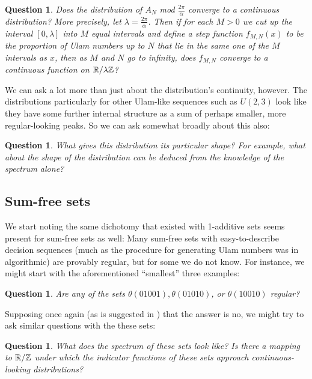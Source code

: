 \documentclass{article}
\newtheorem{question}[theorem]{Question}
\theoremstyle{definition}
\theoremstyle{remark}
\numberwithin{equation}{section}
\begin{document}
\begin{question}\label{qn:continuity}
  Does the distribution of $A_N$ mod $\frac{2\pi}{\alpha}$ converge to
  a continuous distribution?  More precisely, let
  $\lambda = \frac{2\pi}{\alpha}$.  Then if for each $M > 0$ we cut up
  the interval $[0,\lambda]$ into $M$ equal intervals and define a
  step function $f_{M,N}(x)$ to be the proportion of Ulam numbers up
  to $N$ that lie in the same one of the $M$ intervals as $x$, then as
  $M$ and $N$ go to infinity, does $f_{M,N}$ converge to a continuous
  function on $\mathbb{R}/\lambda\mathbb{Z}$?
\end{question}

We can ask a lot more than just about the distribution's continuity,
however.  The distributions particularly for other Ulam-like sequences
such as $U(2,3)$ look like they have some further internal structure
as a sum of perhaps smaller, more regular-looking peaks.  So we can
ask somewhat broadly about this also: 

\begin{question}\label{qn:shape}
  What gives this distribution its particular shape?  For example,
  what about the shape of the distribution can be deduced from the
  knowledge of the spectrum alone?
\end{question}

\subsection{Sum-free sets}

We start noting the same dichotomy that existed with 1-additive sets
seems present for sum-free sets as well: Many sum-free sets with
easy-to-describe decision sequences (much as the procedure for
generating Ulam numbers was in algorithmic) are provably regular, but
for some we do not know.  For instance, we might start with the
aforementioned ``smallest'' three examples: 

\begin{question}\label{qn:sumfree_regularity}
  Are any of the sets $\theta(01001), \theta(01010)$, or
  $\theta(10010)$ regular?
\end{question}

Supposing once again (as is suggested in
\cite{difference_density_calkin}) that the answer is no, we might try
to ask similar questions with the these sets:

\begin{question}\label{qn:sumfree_spectrum}
  What does the spectrum of these sets look like?  Is there a mapping
  to $\mathbb{R}/\mathbb{Z}$ under which the indicator functions of these sets
  approach continuous-looking distributions?
\end{question}
\end{document}
